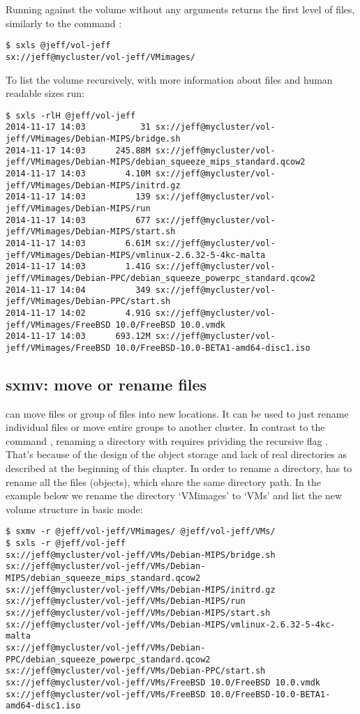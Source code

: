 Running  against the volume without any arguments returns the first
level of files, similarly to the command :
\begin{lstlisting}
$ sxls @jeff/vol-jeff
sx://jeff@mycluster/vol-jeff/VMimages/
\end{lstlisting}
To list the volume recursively, with more information about files and human
readable sizes run:
\begin{lstlisting}
$ sxls -rlH @jeff/vol-jeff
2014-11-17 14:03           31 sx://jeff@mycluster/vol-jeff/VMimages/Debian-MIPS/bridge.sh
2014-11-17 14:03      245.88M sx://jeff@mycluster/vol-jeff/VMimages/Debian-MIPS/debian_squeeze_mips_standard.qcow2
2014-11-17 14:03        4.10M sx://jeff@mycluster/vol-jeff/VMimages/Debian-MIPS/initrd.gz
2014-11-17 14:03          139 sx://jeff@mycluster/vol-jeff/VMimages/Debian-MIPS/run
2014-11-17 14:03          677 sx://jeff@mycluster/vol-jeff/VMimages/Debian-MIPS/start.sh
2014-11-17 14:03        6.61M sx://jeff@mycluster/vol-jeff/VMimages/Debian-MIPS/vmlinux-2.6.32-5-4kc-malta
2014-11-17 14:03        1.41G sx://jeff@mycluster/vol-jeff/VMimages/Debian-PPC/debian_squeeze_powerpc_standard.qcow2
2014-11-17 14:04          349 sx://jeff@mycluster/vol-jeff/VMimages/Debian-PPC/start.sh
2014-11-17 14:02        4.91G sx://jeff@mycluster/vol-jeff/VMimages/FreeBSD 10.0/FreeBSD 10.0.vmdk
2014-11-17 14:03      693.12M sx://jeff@mycluster/vol-jeff/VMimages/FreeBSD 10.0/FreeBSD-10.0-BETA1-amd64-disc1.iso
\end{lstlisting}

\subsection{sxmv: move or rename files}
 can move files or group of files into new locations. It can be
used to just rename individual files or move entire groups to another cluster.
In contrast to the command , renaming a directory with 
requires prividing the recursive flag . That's because of the design
of the object storage and lack of real directories as described at the beginning
of this chapter. In order to rename a directory,  has to rename all the
files (objects), which share the same directory path. In the example below we rename
the directory `VMimages' to `VMs' and list the new volume structure in basic mode:
\begin{lstlisting}
$ sxmv -r @jeff/vol-jeff/VMimages/ @jeff/vol-jeff/VMs/
$ sxls -r @jeff/vol-jeff
sx://jeff@mycluster/vol-jeff/VMs/Debian-MIPS/bridge.sh
sx://jeff@mycluster/vol-jeff/VMs/Debian-MIPS/debian_squeeze_mips_standard.qcow2
sx://jeff@mycluster/vol-jeff/VMs/Debian-MIPS/initrd.gz
sx://jeff@mycluster/vol-jeff/VMs/Debian-MIPS/run
sx://jeff@mycluster/vol-jeff/VMs/Debian-MIPS/start.sh
sx://jeff@mycluster/vol-jeff/VMs/Debian-MIPS/vmlinux-2.6.32-5-4kc-malta
sx://jeff@mycluster/vol-jeff/VMs/Debian-PPC/debian_squeeze_powerpc_standard.qcow2
sx://jeff@mycluster/vol-jeff/VMs/Debian-PPC/start.sh
sx://jeff@mycluster/vol-jeff/VMs/FreeBSD 10.0/FreeBSD 10.0.vmdk
sx://jeff@mycluster/vol-jeff/VMs/FreeBSD 10.0/FreeBSD-10.0-BETA1-amd64-disc1.iso
\end{lstlisting}

